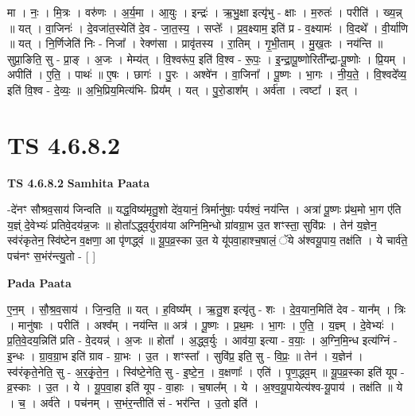 \documentclass[17pt]{extarticle}
\begin{document}
मा । नः॒ । मि॒त्रः । वरु॑णः । अ॒र्य॒मा । आ॒युः । इन्द्रः॑ । ऋ॒भु॒क्षा इत्यृ॑भु - क्षाः । म॒रुतः॑ । परीति॑ । ख्य॒न्न् ॥ यत् । वा॒जिनः॑ । दे॒वजा॑त॒स्येति॑ दे॒व - जा॒त॒स्य॒ । सप्तेः᳚ । प्र॒व॒क्ष्याम॒ इति॑ प्र - व॒क्ष्यामः॑ । वि॒दथे᳚ । वी॒र्या॑णि ॥ यत् । नि॒र्णिजेति॑ निः - निजा᳚ । रेक्ण॑सा । प्रावृ॑तस्य । रा॒तिम् । गृ॒भी॒ताम् । मु॒ख॒तः । नय॑न्ति ॥ सुप्रा॒ङिति॒ सु - प्रा॒ङ् । अ॒जः । मेम्य॑त् । वि॒श्वरू॑प॒ इति॑ वि॒श्व - रू॒पः॒ । इ॒न्द्रा॒पू॒ष्णोरिती᳚न्द्रा-पू॒ष्णोः । प्रि॒यम् । अपीति॑ । ए॒ति॒ । पाथः॑ ॥ ए॒षः । छागः॑ । पु॒रः । अश्वे॑न । वा॒जिना᳚ । पू॒ष्णः । भा॒गः । नी॒य॒ते॒ । वि॒श्वदे᳚व्य॒ इति॑ वि॒श्व - दे॒व्यः॒ ॥ अ॒भि॒प्रिय॒मित्य॑भि- प्रिय᳚म् । यत् । पु॒रो॒डाश᳚म् । अर्व॑ता । त्वष्टा᳚ । इत् ।  \newline




\section*{ TS 4.6.8.2 }

\textbf{TS 4.6.8.2 } \newline
\textbf{Samhita Paata} \newline

-दे॑नꣳ सौश्रव॒साय॑ जिन्वति ॥ यद्ध॒विष्य॑मृतु॒शो दे॑व॒यानं॒ त्रिर्मानु॑षाः॒ पर्यश्वं॒ नय॑न्ति । अत्रा॑ पू॒ष्णः प्र॑थ॒मो भा॒ग ए॑ति य॒ज्ञ्ं दे॒वेभ्यः॑ प्रतिवे॒दय॑न्न॒जः ॥ होता᳚ऽद्ध्व॒र्युराव॑या अग्निमि॒न्धो ग्रा॑वग्रा॒भ उ॒त शꣳस्ता॒ सुवि॑प्रः । तेन॑ य॒ज्ञेन॒ स्व॑रंकृतेन॒ स्वि॑ष्टेन व॒क्षणा॒ आ पृ॑णद्ध्वं ॥ यू॒प॒व्र॒स्का उ॒त ये यू॑पवा॒हाश्च॒षालं॒ ॅये अ॑श्वयू॒पाय॒ तक्ष॑ति । ये चार्व॑ते॒ पच॑नꣳ स॒भंर॑न्त्यु॒तो - [  ] \newline

\textbf{Pada Paata} \newline

ए॒न॒म् । सौ॒श्र॒व॒साय॑ । जि॒न्व॒ति॒ ॥ यत् । ह॒विष्य᳚म् । ऋ॒तु॒श इत्यृ॑तु - शः । दे॒व॒यान॒मिति॑ देव - यान᳚म् । त्रिः । मानु॑षाः । परीति॑ । अश्व᳚म् । नय॑न्ति ॥ अत्र॑ । पू॒ष्णः । प्र॒थ॒मः । भा॒गः । ए॒ति॒ । य॒ज्ञ्म् । दे॒वेभ्यः॑ । प्र॒ति॒वे॒दय॒न्निति॑ प्रति - वे॒दयन्न्॑ । अ॒जः ॥ होता᳚ । अ॒द्ध्व॒र्युः । आव॑या॒ इत्या - व॒याः॒ । अ॒ग्नि॒मि॒न्ध इत्य॑ग्निं - इ॒न्धः । ग्रा॒व॒ग्रा॒भ इति॑ ग्राव - ग्रा॒भः । उ॒त । शꣳस्ता᳚ । सुवि॑प्र॒ इति॒ सु - वि॒प्रः॒ ॥ तेन॑ । य॒ज्ञेन॑ । स्व॑रंकृते॒नेति॒ सु - अ॒र॒कृं॒ते॒न॒ । स्वि॑ष्टे॒नेति॒ सु - इ॒ष्टे॒न॒ । व॒क्षणाः᳚ । एति॑ । पृ॒ण॒द्ध्व॒म् ॥ यू॒प॒व्र॒स्का इति॑ यूप - व्र॒स्काः । उ॒त । ये । यू॒प॒वा॒हा इति॑ यूप - वा॒हाः । च॒षाल᳚म् । ये । अ॒श्व॒यू॒पायेत्य॑श्व-यू॒पाय॑ । तक्ष॑ति ॥ ये । च॒ । अर्व॑ते । पच॑नम् । स॒भंर॒न्तीति॑ सं - भर॑न्ति । उ॒तो इति॑ ।  \newline
\end{document}
